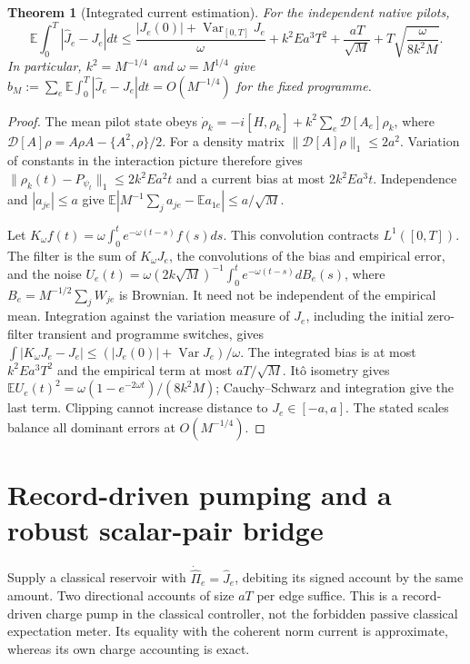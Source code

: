 \documentclass[11pt,oneside,openany]{book}
\newtheorem{theorem}{Theorem}[chapter]
\theoremstyle{definition}
\theoremstyle{remark}\newtheorem{remark}[theorem]{Remark}
\begin{document}
\begin{theorem}[Integrated current estimation]\label{copy:estimate}
For the independent native pilots,
\begin{equation}
 \mathbb E\int_0^T|\widehat J_e-J_e|dt
 \le\frac{|J_e(0)|+\operatorname{Var}_{[0,T]}J_e}{\omega}
   +k^2Ea^3T^2+\frac{aT}{\sqrt M}
                   +T\sqrt{\frac{\omega}{8k^2M}}.           \label{copy:estimate-bound}
\end{equation}
In particular, $k^2=M^{-1/4}$ and $\omega=M^{1/4}$ give
$b_M:=\sum_e\mathbb E\int_0^T|\widehat J_e-J_e|dt
=O(M^{-1/4})$ for the fixed programme.
\end{theorem}
\begin{proof}
The mean pilot state obeys
$\dot\rho_k=-i[H,\rho_k]+k^2\sum_e\mathcal D[A_e]\rho_k$,
where $\mathcal D[A]\rho=A\rho A-\{A^2,\rho\}/2$.
For a density matrix $\|\mathcal D[A]\rho\|_1\le2a^2$.
Variation of constants in the interaction picture therefore gives
$\|\rho_k(t)-P_{\psi_t}\|_1\le2k^2Ea^2t$ and a current bias at
most $2k^2Ea^3t$. Independence and $|a_{je}|\le a$ give
$\mathbb E|M^{-1}\sum_ja_{je}-\mathbb E a_{1e}|\le a/\sqrt M$.

Let $K_\omega f(t)=\omega\int_0^te^{-\omega(t-s)}f(s)ds$.
This convolution contracts $L^1([0,T])$. The filter is the sum of
$K_\omega J_e$, the convolutions of the bias and empirical error,
and the noise
$U_e(t)=\omega(2k\sqrt M)^{-1}
\int_0^te^{-\omega(t-s)}dB_e(s)$,
where $B_e=M^{-1/2}\sum_jW_{je}$ is Brownian. It need not be
independent of the empirical mean. Integration against the variation
measure of $J_e$, including the initial zero-filter transient and
programme switches, gives
$\int|K_\omega J_e-J_e|
\le(|J_e(0)|+\operatorname{Var}J_e)/\omega$.
The integrated bias is at most $k^2Ea^3T^2$ and the empirical term
at most $aT/\sqrt M$. It\^o isometry gives
$\mathbb E U_e(t)^2=\omega(1-e^{-2\omega t})/(8k^2M)$;
Cauchy--Schwarz and integration give the last term. Clipping cannot
increase distance to $J_e\in[-a,a]$. The stated scales balance all
dominant errors at $O(M^{-1/4})$.
\end{proof}

\section{Record-driven pumping and a robust scalar-pair bridge}

Supply a classical reservoir with
$\dot{\widehat\Pi}_e=\widehat J_e$, debiting its signed account by
the same amount. Two directional accounts of size $aT$ per edge
suffice. This is a record-driven charge pump in the classical
controller, not the forbidden passive classical expectation meter.
Its equality with the coherent norm current is approximate, whereas
its own charge accounting is exact.
\end{document}
